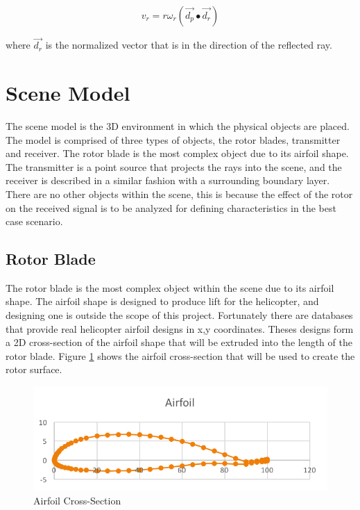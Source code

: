 \begin{equation}
	v_r = r \omega_r (\vec{d_p} \bullet \vec{d_r})
	\label{eqn:v_r}
\end{equation}

where $\vec{d_r}$ is the normalized vector that is in the direction of the reflected ray.

\section{Scene Model}
The scene model is the 3D environment in which the physical objects are placed. 
The model is comprised of three types of objects, the rotor blades, transmitter and receiver. The rotor blade is the most complex object due to its airfoil shape. The transmitter is a point source that projects the rays into the scene, and the receiver is described in a similar fashion with a surrounding boundary layer. There are no other objects within the scene, this is because the effect of the rotor on the received signal is to be analyzed for defining characteristics in the best case scenario.

\subsection{Rotor Blade}
The rotor blade is the most complex object within the scene due to its airfoil shape. The airfoil shape is designed to produce lift for the helicopter, and designing one is outside the scope of this project. Fortunately there are databases that provide real helicopter airfoil designs in x,y coordinates. Theses designs form a 2D cross-section of the airfoil shape that will be extruded into the length of the rotor blade. Figure \ref{fig:airfoil} shows the airfoil cross-section that will be used to create the rotor surface. 

\begin{figure}
	\begin{center}
		\includegraphics[width=15cm]{images/radio_propagation/2d_airfoil.png}
		\caption{Airfoil Cross-Section}
		\label{fig:airfoil}
	\end{center}
\end{figure}

